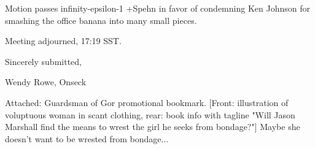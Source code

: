 \documentclass[12pt]{article}
\begin{document}
Motion passes infinity-epsilon-1 +Spehn in favor of condemning Ken Johnson for smashing the office banana into many small pieces.

\vspace{12pt}

\noindent
Meeting adjourned, 17:19 SST.

\vspace{18pt}

\centerline{Sincerely submitted,}
\centerline{Wendy Rowe, Onseck}

Attached: Guardsman of Gor promotional bookmark. [Front: illustration of voluptuous woman in scant clothing, rear: book info with tagline "Will Jason Marshall find the means to wrest the girl he seeks from bondage?"] Maybe she doesn't want to be wrested from bondage...
\end{document}
